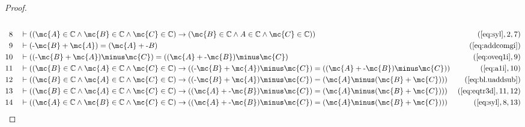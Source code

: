 \begin{proof}
\begin{align}
  \\ 8 &&  & \vdash ( ( \mc{A} \in \mathbb{C} \wedge \mc{B} \in \mathbb{C} \wedge \mc{C} \in
    \mathbb{C} ) \rightarrow ( \mc{B} \in \mathbb{C} \wedge A
    \in \mathbb{C} \wedge \mc{C} \in \mathbb{C} )
    )&(\mbox{\ref{eq:syl}},2,7)\notag
  \\ 9 &&  & \vdash ( \textrm{-} \mc{B} + \mc{A} ) = ( \mc{A} + \textrm{-} B
    )&(\mbox{\ref{eq:addcomgi}})\notag
  \\ 10 &&  & \vdash ( ( \textrm{-} \mc{B} + \mc{A} ) \minus \mc{C} ) = ( ( \mc{A} + \textrm{-} \mc{B} )
    \minus \mc{C} )&(\mbox{\ref{eq:oveq1i}},9)\notag
  \\ 11 &&  & \vdash ( ( \mc{B} \in \mathbb{C} \wedge \mc{A} \in \mathbb{C} \wedge \mc{C} \in
    \mathbb{C} ) \rightarrow ( ( \textrm{-} \mc{B} + \mc{A} )
    \minus \mc{C} ) = ( ( \mc{A} + \textrm{-} \mc{B} ) \minus \mc{C} )
    )&(\mbox{\ref{eq:a1i}},10)\notag
  \\ 12 &&  & \vdash ( ( \mc{B} \in \mathbb{C} \wedge \mc{A} \in \mathbb{C} \wedge \mc{C} \in
    \mathbb{C} ) \rightarrow ( ( \textrm{-} \mc{B} + \mc{A} )
    \minus \mc{C} ) = ( \mc{A} \minus ( \mc{B} + \mc{C} ) )
    )&(\mbox{\ref{eq:bl.uaddsub}})\notag
  \\ 13 &&  & \vdash ( ( \mc{B} \in \mathbb{C} \wedge \mc{A} \in \mathbb{C} \wedge \mc{C} \in
    \mathbb{C} ) \rightarrow ( ( \mc{A} + \textrm{-} \mc{B} )
    \minus \mc{C} ) = ( \mc{A} \minus ( \mc{B} + \mc{C} ) )
    )&(\mbox{\ref{eq:eqtr3d}},11,12)\notag
  \\ 14 &&  & \vdash ( ( \mc{A} \in \mathbb{C} \wedge \mc{B} \in \mathbb{C} \wedge \mc{C} \in
    \mathbb{C} ) \rightarrow ( ( \mc{A} + \textrm{-} \mc{B} )
    \minus \mc{C} ) = ( \mc{A} \minus ( \mc{B} + \mc{C} ) )
    )&(\mbox{\ref{eq:syl}},8,13)\notag
\end{align}
\end{proof}

